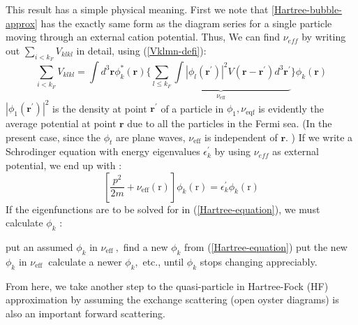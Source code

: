 This result has a simple physical meaning. First we note that \ref{Hartree-bubble-approx} has the exactly same form as the diagram series for a single particle moving through an external cation potential. Thus, We can find $\nu_{eff}$ by writing out $\sum_{i<k_{F}} V_{k l k l}$ in detail, using (\ref{Vklmn-defi}):
\begin{equation}
    \sum_{i<k_{F}} V_{k l k l}=\int d^{3} \mathbf{r} \phi_{k}^{*}(\mathbf{r})\{\underbrace{\left.\sum_{l \leq k_{F}} \int\left|\phi_{l}\left(\mathbf{r}^{\prime}\right)\right|^{2} V\left(\mathbf{r}-\mathbf{r}^{\prime}\right) d^{3} \mathbf{r}^{\prime}\right.}_{\nu_{\mathrm{eff}}}\}\phi_{k}(\mathbf{r})
\end{equation}
$\left|\phi_{1}\left(\mathbf{r}^{\prime}\right)\right|^{2}$ is the density at point $\mathbf{r}^{\prime}$ of a particle in $\phi_{1}, \nu_{\mathrm{eqf}}$ is evidently the average potential at point $\mathbf{r}$ due to all the particles in the Fermi sea. (In the present case, since the $\phi_{t}$ are plane waves, $\nu_{\mathrm{eff}}$ is independent of $\mathbf{r} .$ ) If we write a Schrodinger equation with energy eigenvalues $\epsilon^{\prime}_k$ by using $\nu_{eff}$ as external potential, we end up with :
\begin{equation}\left[\frac{p^{2}}{2 m}+\nu_{\mathrm{eff}}(\mathrm{r})\right] \phi_{k}(\mathrm{r})=\epsilon_{k}^{\prime} \phi_{k}(\mathrm{r})
\label{Hartree-equation}
\end{equation}
If the eigenfunctions are to be solved for in (\ref{Hartree-equation}), we must calculate $\phi_k$ :
\begin{mybox}
put an assumed $\phi_{k}$ in $\nu_{\text {eff }},$ find a new $\phi_{k}$ from (\ref{Hartree-equation}) put the new $\phi_{k}$ in $\nu_{\text {eff }}$ calculate a newer $\phi_{k},$ etc., until $\phi_{k}$ stops changing appreciably.
\end{mybox}
From here, we take another step to the quasi-particle in Hartree-Fock (HF) approximation by assuming the exchange scattering (open oyster diagrams) is also an important forward scattering.
